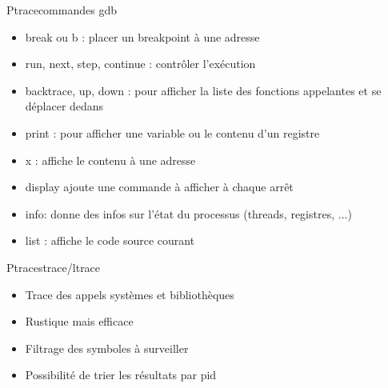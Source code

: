 \begin{frame}{Ptrace}{commandes gdb}
	\begin{itemize}
		\item
			break ou b : placer un breakpoint à une adresse
		\item
			run, next, step, continue : contrôler l’exécution
		\item
			backtrace, up, down : pour afficher la liste des fonctions appelantes et se déplacer dedans
		\item
			print : pour afficher une variable ou le contenu d'un registre
		\item
			x : affiche le contenu à une adresse
		\item
			display ajoute une commande à afficher à chaque arrêt
		\item
			info: donne des infos sur l'état du processus (threads, registres, ...)
		\item
			list : affiche le code source courant
	\end{itemize}
\end{frame}

\begin{frame}{Ptrace}{strace/ltrace}
	\begin{itemize}
		\item
			Trace des appels systèmes et bibliothèques
		\item
			Rustique mais efficace
		\item
			Filtrage des symboles à surveiller
		\item
			Possibilité de trier les résultats par pid  
	\end{itemize}
\end{frame}

